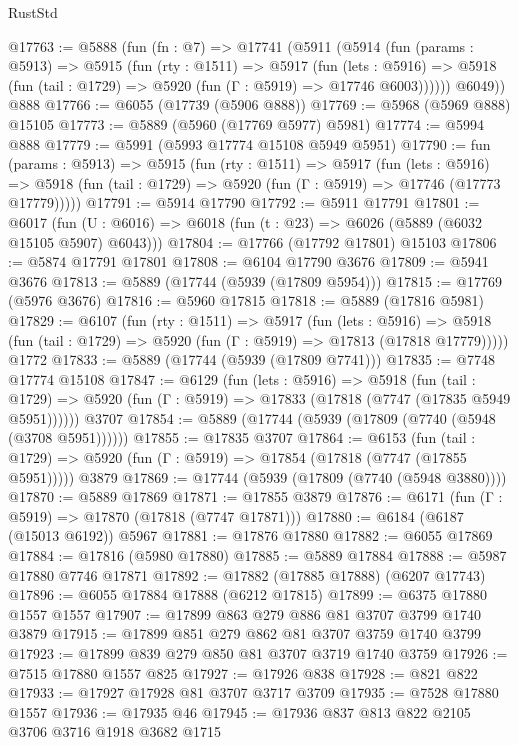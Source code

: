 \begin{lexlean}{RustStd}
\begin{coremodule}
@17763 := @5888
    (fun (fn : @7) =>
    @17741
      (@5911
        (@5914
          (fun (params : @5913) =>
          @5915
            (fun (rty : @1511) =>
            @5917
              (fun (lets : @5916) =>
              @5918 (fun (tail : @1729) => @5920 (fun (Γ : @5919) => @17746 @6003))))))
        @6049))
    @888
@17766 := @6055 (@17739 (@5906 @888))
@17769 := @5968 (@5969 @888) @15105
@17773 := @5889 (@5960 (@17769 @5977) @5981)
@17774 := @5994 @888
@17779 := @5991 (@5993 @17774 @15108 @5949 @5951)
@17790 := fun (params : @5913) =>
  @5915
    (fun (rty : @1511) =>
    @5917
      (fun (lets : @5916) =>
      @5918 (fun (tail : @1729) => @5920 (fun (Γ : @5919) => @17746 (@17773 @17779)))))
@17791 := @5914 @17790
@17792 := @5911 @17791
@17801 := @6017
    (fun (U : @6016) => @6018 (fun (t : @23) => @6026 (@5889 (@6032 @15105 @5907) @6043)))
@17804 := @17766 (@17792 @17801) @15103
@17806 := @5874 @17791 @17801
@17808 := @6104 @17790 @3676
@17809 := @5941 @3676
@17813 := @5889 (@17744 (@5939 (@17809 @5954)))
@17815 := @17769 (@5976 @3676)
@17816 := @5960 @17815
@17818 := @5889 (@17816 @5981)
@17829 := @6107
    (fun (rty : @1511) =>
    @5917
      (fun (lets : @5916) =>
      @5918 (fun (tail : @1729) => @5920 (fun (Γ : @5919) => @17813 (@17818 @17779)))))
    @1772
@17833 := @5889 (@17744 (@5939 (@17809 @7741)))
@17835 := @7748 @17774 @15108
@17847 := @6129
    (fun (lets : @5916) =>
    @5918
      (fun (tail : @1729) =>
      @5920 (fun (Γ : @5919) => @17833 (@17818 (@7747 (@17835 @5949 @5951))))))
    @3707
@17854 := @5889 (@17744 (@5939 (@17809 (@7740 (@5948 (@3708 @5951))))))
@17855 := @17835 @3707
@17864 := @6153
    (fun (tail : @1729) => @5920 (fun (Γ : @5919) => @17854 (@17818 (@7747 (@17855 @5951)))))
    @3879
@17869 := @17744 (@5939 (@17809 (@7740 (@5948 @3880))))
@17870 := @5889 @17869
@17871 := @17855 @3879
@17876 := @6171 (fun (Γ : @5919) => @17870 (@17818 (@7747 @17871)))
@17880 := @6184 (@6187 (@15013 @6192)) @5967
@17881 := @17876 @17880
@17882 := @6055 @17869
@17884 := @17816 (@5980 @17880)
@17885 := @5889 @17884
@17888 := @5987 @17880 @7746 @17871
@17892 := @17882 (@17885 @17888) (@6207 @17743)
@17896 := @6055 @17884 @17888 (@6212 @17815)
@17899 := @6375 @17880 @1557 @1557
@17907 := @17899 @863 @279 @886 @81 @3707 @3799 @1740 @3879
@17915 := @17899 @851 @279 @862 @81 @3707 @3759 @1740 @3799
@17923 := @17899 @839 @279 @850 @81 @3707 @3719 @1740 @3759
@17926 := @7515 @17880 @1557 @825
@17927 := @17926 @838
@17928 := @821 @822
@17933 := @17927 @17928 @81 @3707 @3717 @3709
@17935 := @7528 @17880 @1557
@17936 := @17935 @46
@17945 := @17936 @837 @813 @822 @2105 @3706 @3716 @1918 @3682 @1715

\end{coremodule}
\end{lexlean}
